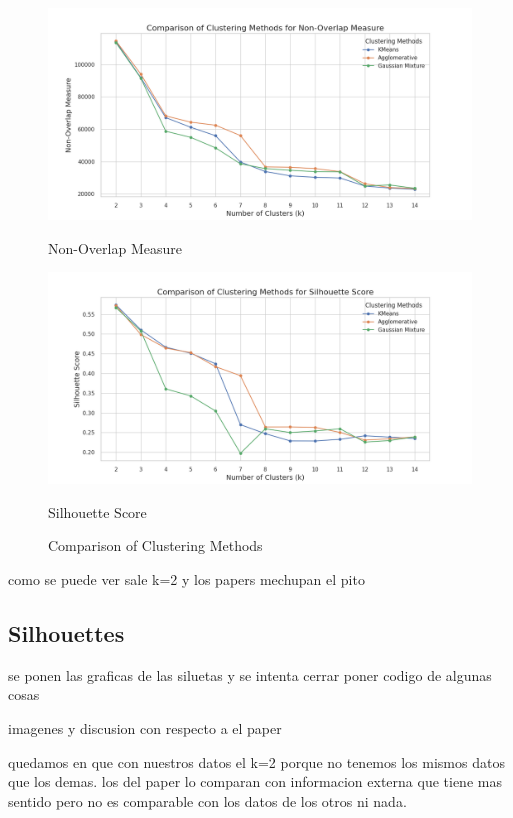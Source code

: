 \documentclass{article}
\begin{document}
\begin{figure}[H]
	\begin{minipage}{0.45\textwidth}
		\centering
		\includegraphics[width=\textwidth]{images/clustering_Non-Overlap Measure.png}
		\caption{Non-Overlap Measure}
		\label{fig:non_overlap}
	\end{minipage}\hfill
	\begin{minipage}{0.45\textwidth}
		\centering
		\includegraphics[width=\textwidth]{images/clustering_Silhouette Score.png}
		\caption{Silhouette Score}
		\label{fig:silhouette_score}
	\end{minipage}
	
	\caption{Comparison of Clustering Methods}
	\label{fig:clustering_methods}
\end{figure}
 como se puede ver sale k=2 y los papers mechupan el pito
\subsection{Silhouettes}

se ponen las graficas de las siluetas y se intenta cerrar
\newpage
poner codigo de algunas cosas


imagenes y discusion con respecto a el paper

quedamos en que con nuestros datos el k=2 porque no tenemos los mismos datos que los demas. los del paper lo comparan con informacion externa que tiene mas sentido pero no es comparable con los datos de los otros ni nada.
\end{document}

